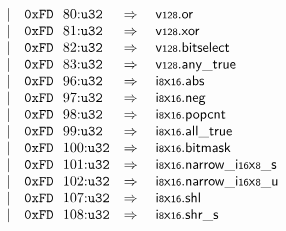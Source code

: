 $$\begin{array}[t]{@{}lrrl@{}l@{}l@{}l@{}}
& & | & \mathtt{0xFD}~~80{:}{\mathtt{u32}} & \quad\Rightarrow\quad{} & \mathsf{v{\scriptstyle 128}} {.} \mathsf{or} \\
& & | & \mathtt{0xFD}~~81{:}{\mathtt{u32}} & \quad\Rightarrow\quad{} & \mathsf{v{\scriptstyle 128}} {.} \mathsf{xor} \\
& & | & \mathtt{0xFD}~~82{:}{\mathtt{u32}} & \quad\Rightarrow\quad{} & \mathsf{v{\scriptstyle 128}} {.} \mathsf{bitselect} \\
& & | & \mathtt{0xFD}~~83{:}{\mathtt{u32}} & \quad\Rightarrow\quad{} & \mathsf{v{\scriptstyle 128}} {.} \mathsf{any\_true} \\
& & | & \mathtt{0xFD}~~96{:}{\mathtt{u32}} & \quad\Rightarrow\quad{} & {\mathsf{i{\scriptstyle 8}}}{\mathsf{x}}{\mathsf{{\scriptstyle 16}}} {.} \mathsf{abs} \\
& & | & \mathtt{0xFD}~~97{:}{\mathtt{u32}} & \quad\Rightarrow\quad{} & {\mathsf{i{\scriptstyle 8}}}{\mathsf{x}}{\mathsf{{\scriptstyle 16}}} {.} \mathsf{neg} \\
& & | & \mathtt{0xFD}~~98{:}{\mathtt{u32}} & \quad\Rightarrow\quad{} & {\mathsf{i{\scriptstyle 8}}}{\mathsf{x}}{\mathsf{{\scriptstyle 16}}} {.} \mathsf{popcnt} \\
& & | & \mathtt{0xFD}~~99{:}{\mathtt{u32}} & \quad\Rightarrow\quad{} & {\mathsf{i{\scriptstyle 8}}}{\mathsf{x}}{\mathsf{{\scriptstyle 16}}} {.} \mathsf{all\_true} \\
& & | & \mathtt{0xFD}~~100{:}{\mathtt{u32}} & \quad\Rightarrow\quad{} & {\mathsf{i{\scriptstyle 8}}}{\mathsf{x}}{\mathsf{{\scriptstyle 16}}}{.}\mathsf{bitmask} \\
& & | & \mathtt{0xFD}~~101{:}{\mathtt{u32}} & \quad\Rightarrow\quad{} & {{\mathsf{i{\scriptstyle 8}}}{\mathsf{x}}{\mathsf{{\scriptstyle 16}}}{.}\mathsf{narrow}}{\mathsf{\_}}{{\mathsf{i{\scriptstyle 16}}}{\mathsf{x}}{\mathsf{{\scriptstyle 8}}}}{\mathsf{\_}}{\mathsf{s}} \\
& & | & \mathtt{0xFD}~~102{:}{\mathtt{u32}} & \quad\Rightarrow\quad{} & {{\mathsf{i{\scriptstyle 8}}}{\mathsf{x}}{\mathsf{{\scriptstyle 16}}}{.}\mathsf{narrow}}{\mathsf{\_}}{{\mathsf{i{\scriptstyle 16}}}{\mathsf{x}}{\mathsf{{\scriptstyle 8}}}}{\mathsf{\_}}{\mathsf{u}} \\
& & | & \mathtt{0xFD}~~107{:}{\mathtt{u32}} & \quad\Rightarrow\quad{} & {\mathsf{i{\scriptstyle 8}}}{\mathsf{x}}{\mathsf{{\scriptstyle 16}}} {.} \mathsf{shl} \\
& & | & \mathtt{0xFD}~~108{:}{\mathtt{u32}} & \quad\Rightarrow\quad{} & {\mathsf{i{\scriptstyle 8}}}{\mathsf{x}}{\mathsf{{\scriptstyle 16}}} {.} {\mathsf{shr}}{\mathsf{\_}}{\mathsf{s}} \\

\end{array}$$
